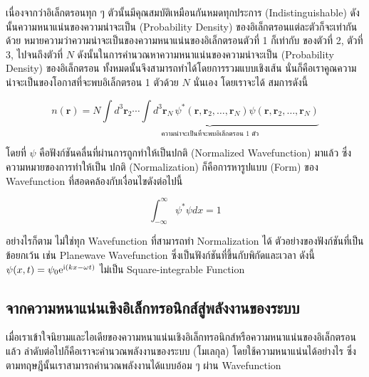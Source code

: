 เนื่องจากว่าอิเล็กตรอนทุก ๆ ตัวนั้นมีคุณสมบัติเหมือนกันหมดทุกประการ (Indistinguishable) ดังนั้นความหนาแน่นของความน่าจะเป็น 
(Probability Density) ของอิเล็กตรอนแต่ละตัวก็จะเท่ากันด้วย หมายความว่าความน่าจะเป็นของความหนาแน่นของอิเล็กตรอนตัวที่ 1 ก็เท่ากับ%
ของตัวที่ 2, ตัวที่ 3, ไปจนถึงตัวที่ $N$ ดังนั้นในการคำนวณหาความหนาแน่นของความน่าจะเป็น (Probability Density) ของอิเล็กตรอน%
ทั้งหมดนั้นจึงสามารถทำได้โดยการรวมแบบเชิงเส้น นั่นก็คือเราคูณความน่าจะเป็นของโอกาสที่จะพบอิเล็กตรอน 1 ตัวด้วย $N$ นั่นเอง โดยเราจะได้%
สมการดังนี้

\begin{equation}\label{eq:elec_density_all}
    n(\bm{r}) = N \underbrace{\int {d}^{3} \bm{r}_{2} \cdots \int {d}^{3} \bm{r}_{N} \, 
                \psi^*(\bm{r}, \bm{r}_{2}, \dots, \bm{r}_{N}) \psi(\bm{r}, \bm{r}_2, 
                \dots, \bm{r}_N)}_{\textstyle \text{ความน่าจะเป็นที่จะพบอิเล็กตรอน 1 ตัว}}
\end{equation}

\noindent โดยที่ $\psi$ คือฟังก์ชันคลื่นที่ผ่านการถูกทำให้เป็นปกติ (Normalized Wavefunction) มาแล้ว ซึ่งความหมายของการทำให้เป็น%
ปกติ (Normalization) ก็คือการหารูปแบบ (Form) ของ Wavefunction ที่สอดคล้องกับเงื่อนไขดังต่อไปนี้

\begin{equation}\label{eq:square_integrable}
    \int^\infty_{-\infty} \psi^* \psi dx = 1
\end{equation}

อย่างไรก็ตาม ไม่ใช่ทุก Wavefunction ที่สามารถทำ Normalization ได้ ตัวอย่างของฟังก์ชันที่เป็นข้อยกเว้น เช่น Planewave Wavefunction 
ซึ่งเป็นฟังก์ชันที่ขึ้นกับพิกัดและเวลา ดังนี้ $\psi(x,t) = \psi_0 {\rm e}^{ {\rm i} (k x-\omega t)}$ ไม่เป็น Square-integrable 
Function

\subsection{จากความหนาแน่นเชิงอิเล็กทรอนิกส์สู่พลังงานของระบบ}
\label{ssec:ener_density}

เมื่อเราเข้าใจนิยามและไอเดียของความหนาแน่นเชิงอิเล็กทรอนิกส์หรือความหนาแน่นของอิเล็กตรอนแล้ว ลำดับต่อไปก็คือเราจะคำนวณพลังงานของระบบ
(โมเลกุล) โดยใช้ความหนาแน่นได้อย่างไร ซึ่งตามทฤษฎีนั้นเราสามารถคำนวณพลังงานได้แบบอ้อม ๆ ผ่าน Wavefunction 

